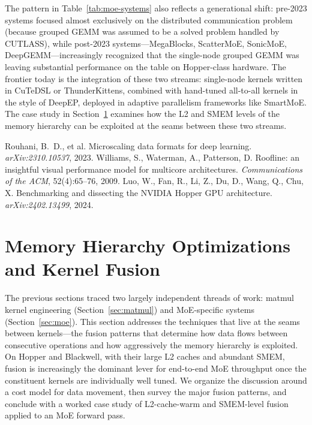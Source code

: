\documentclass[10pt]{article}
\begin{document}
The pattern in Table~\ref{tab:moe-systems} also reflects a generational shift: pre-2023 systems focused almost exclusively on the distributed communication problem (because grouped GEMM was assumed to be a solved problem handled by CUTLASS), while post-2023 systems---MegaBlocks, ScatterMoE, SonicMoE, DeepGEMM---increasingly recognized that the single-node grouped GEMM was leaving substantial performance on the table on Hopper-class hardware. The frontier today is the integration of these two streams: single-node kernels written in CuTeDSL or ThunderKittens, combined with hand-tuned all-to-all kernels in the style of DeepEP, deployed in adaptive parallelism frameworks like SmartMoE. The case study in Section~\ref{sec:fusion} examines how the L2 and SMEM levels of the memory hierarchy can be exploited at the seams between these two streams.


 Rouhani, B.~D., et al. Microscaling data formats for deep learning. \emph{arXiv:2310.10537}, 2023.
 Williams, S., Waterman, A., Patterson, D. Roofline: an insightful visual performance model for multicore architectures. \emph{Communications of the ACM}, 52(4):65--76, 2009.
 Luo, W., Fan, R., Li, Z., Du, D., Wang, Q., Chu, X. Benchmarking and dissecting the NVIDIA Hopper GPU architecture. \emph{arXiv:2402.13499}, 2024.

\section{Memory Hierarchy Optimizations and Kernel Fusion}
\label{sec:fusion}

The previous sections traced two largely independent threads of work: matmul kernel engineering (Section~\ref{sec:matmul}) and MoE-specific systems (Section~\ref{sec:moe}). This section addresses the techniques that live at the seams between kernels---the fusion patterns that determine how data flows between consecutive operations and how aggressively the memory hierarchy is exploited. On Hopper and Blackwell, with their large L2 caches and abundant SMEM, fusion is increasingly the dominant lever for end-to-end MoE throughput once the constituent kernels are individually well tuned. We organize the discussion around a cost model for data movement, then survey the major fusion patterns, and conclude with a worked case study of L2-cache-warm and SMEM-level fusion applied to an MoE forward pass.
\end{document}
